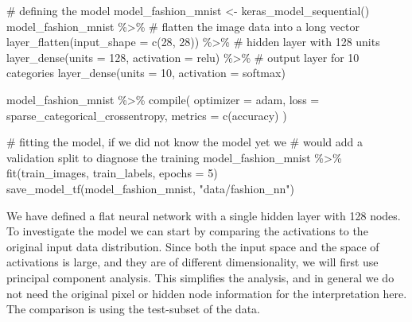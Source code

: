 \documentclass[
  letterpaper,
]{krantz}
\newenvironment{Shaded}{\begin{snugshade}}{\end{snugshade}}
\newcommand{\AttributeTok}[1]{\textcolor[rgb]{0.40,0.45,0.13}{#1}}
\newcommand{\CommentTok}[1]{\textcolor[rgb]{0.37,0.37,0.37}{#1}}
\newcommand{\DecValTok}[1]{\textcolor[rgb]{0.68,0.00,0.00}{#1}}
\newcommand{\FunctionTok}[1]{\textcolor[rgb]{0.28,0.35,0.67}{#1}}
\newcommand{\NormalTok}[1]{\textcolor[rgb]{0.00,0.23,0.31}{#1}}
\newcommand{\OtherTok}[1]{\textcolor[rgb]{0.00,0.23,0.31}{#1}}
\newcommand{\SpecialCharTok}[1]{\textcolor[rgb]{0.37,0.37,0.37}{#1}}
\newcommand{\StringTok}[1]{\textcolor[rgb]{0.13,0.47,0.30}{#1}}
\begin{document}
\begin{Shaded}
\begin{Highlighting}[]
\CommentTok{\# defining the model}
\NormalTok{model\_fashion\_mnist }\OtherTok{\textless{}{-}} \FunctionTok{keras\_model\_sequential}\NormalTok{()}
\NormalTok{model\_fashion\_mnist }\SpecialCharTok{\%\textgreater{}\%}
  \CommentTok{\# flatten the image data into a long vector}
  \FunctionTok{layer\_flatten}\NormalTok{(}\AttributeTok{input\_shape =} \FunctionTok{c}\NormalTok{(}\DecValTok{28}\NormalTok{, }\DecValTok{28}\NormalTok{)) }\SpecialCharTok{\%\textgreater{}\%}
  \CommentTok{\# hidden layer with 128 units}
  \FunctionTok{layer\_dense}\NormalTok{(}\AttributeTok{units =} \DecValTok{128}\NormalTok{, }\AttributeTok{activation =} \StringTok{\textquotesingle{}relu\textquotesingle{}}\NormalTok{) }\SpecialCharTok{\%\textgreater{}\%}
  \CommentTok{\# output layer for 10 categories}
  \FunctionTok{layer\_dense}\NormalTok{(}\AttributeTok{units =} \DecValTok{10}\NormalTok{, }\AttributeTok{activation =} \StringTok{\textquotesingle{}softmax\textquotesingle{}}\NormalTok{)}

\NormalTok{model\_fashion\_mnist }\SpecialCharTok{\%\textgreater{}\%} \FunctionTok{compile}\NormalTok{(}
  \AttributeTok{optimizer =} \StringTok{\textquotesingle{}adam\textquotesingle{}}\NormalTok{,}
  \AttributeTok{loss =} \StringTok{\textquotesingle{}sparse\_categorical\_crossentropy\textquotesingle{}}\NormalTok{,}
  \AttributeTok{metrics =} \FunctionTok{c}\NormalTok{(}\StringTok{\textquotesingle{}accuracy\textquotesingle{}}\NormalTok{)}
\NormalTok{)}

\CommentTok{\# fitting the model, if we did not know the model yet we}
\CommentTok{\# would add a validation split to diagnose the training}
\NormalTok{model\_fashion\_mnist }\SpecialCharTok{\%\textgreater{}\%} \FunctionTok{fit}\NormalTok{(train\_images,}
\NormalTok{              train\_labels,}
              \AttributeTok{epochs =} \DecValTok{5}\NormalTok{)}
\FunctionTok{save\_model\_tf}\NormalTok{(model\_fashion\_mnist, }\StringTok{"data/fashion\_nn"}\NormalTok{)}
\end{Highlighting}
\end{Shaded}

We have defined a flat neural network with a single hidden layer with
128 nodes. To investigate the model we can start by comparing the
activations to the original input data distribution. Since both the
input space and the space of activations is large, and they are of
different dimensionality, we will first use principal component
analysis. This simplifies the analysis, and in general we do not need
the original pixel or hidden node information for the interpretation
here. The comparison is using the test-subset of the data.
\end{document}
